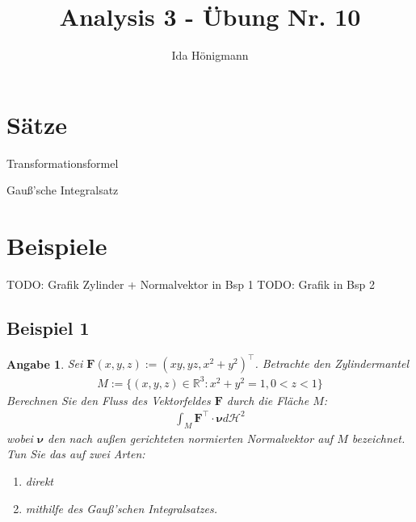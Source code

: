 \documentclass[]{article}
\title{Analysis 3 - Übung Nr. 10}
\author{Ida Hönigmann}
\newtheorem*{angabe*}{Angabe}
\begin{document}
\maketitle

\section{Sätze}

Transformationsformel

Gauß'sche Integralsatz
\newpage

\section{Beispiele}

TODO: Grafik Zylinder + Normalvektor in Bsp 1
TODO: Grafik in Bsp 2

\subsection*{Beispiel 1}
\begin{angabe*}
	Sei $\bm{F}(x,y,z) := (xy, yz, x^2+y^2)^\top$. Betrachte den Zylindermantel
	\begin{align*}
		M := \{(x,y,z) \in \mathbb{R}^3: x^2+y^2=1, 0<z<1\}
	\end{align*}
	Berechnen Sie den Fluss des Vektorfeldes $\mathbf{F}$ durch die Fläche $M$:
	\begin{align*}
		\int_M \bm{F}^\top \cdot \bm{\nu} d\mathcal{H}^2
	\end{align*}
	wobei $\bm{\nu}$ den nach außen gerichteten normierten Normalvektor auf $M$ bezeichnet.
	Tun Sie das auf zwei Arten:
	\begin{enumerate}[label=(\roman*)]
		\item direkt
		\item mithilfe des Gauß'schen Integralsatzes.
	\end{enumerate}
\end{angabe*}
\end{document}
